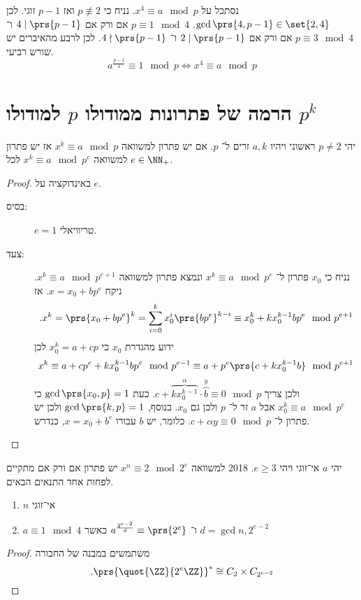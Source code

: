 \documentclass[a4paper,10pt,twoside,openany]{book}
\begin{document}
\begin{example}
נסתכל על
$x^4 \equiv a \mod{p}$.
נניח כי
$p \not \equiv 2$
ואז
$p-1$
זוגי. לכן
$\gcd\prs{4,p-1} \in \set{2,4}$.
$p \equiv 1 \mod{4}$
אם ורק אם
$4 \mid \prs{p-1}$
ו־%
$p \equiv 3 \mod{4}$
אם ורק אם
$2 \mid \prs{p-1}$
ו־%
$4 \nmid \prs{p-1}$.
לכן לרבע מהאיברים יש שורש רביעי.
\[a^{\frac{p-1}{4}} \equiv 1 \mod{p} \iff x^4 \equiv a \mod{p}\]
\end{example}

\section{הרמה של פתרונות ממודולו
$p$
למודולו
$p^k$}
\begin{proposition}
יהי
$p \neq 2$
ראשוני ויהיו
$a,k$
זרים ל־%
$p$.
אם יש פתרון למשוואה
$x^k \equiv a \mod{p}$
אז יש פתרון למשוואה
$x^k \equiv a \mod{p^e}$
לכל
$e \in \NN_+$.
\end{proposition}
\begin{proof}
באינדוקציה על
$e$.
\begin{description}
\item[בסיס:]
$e=1$
טריוויאלי.
\item[צעד:]
נניח כי
$x_0$
פתרון ל־%
$x^k \equiv a\mod{p^e}$
ונמצא פתרון למשוואה
$x^k \equiv a \mod{p^{e+1}}$.
ניקח
$x = x_0 + bp^e$.
אז
\[\text{.}x^k = \prs{x_0 + bp^e}^k = \sum_{i=0}^k x_0^i \prs{bp^e}^{k-i} \equiv x_0^k + kx_0^{k-1}bp^e \mod{p^{e+1}}\]
ידוע מהגדרת
$x_0$
כי
$x_0^k = a + cp$
לכן
\begin{align*}
x^k \equiv a + cp^e + kx_0^{k-1}bp^e \mod{p^{e-1}} \equiv a + p^e \prs{c + kx_0^{k-1}b}\mod{p^{e+1}}
\end{align*}
ולכן צריך
$c + \overset{\alpha}{\overbrace{kx_0^{k-1}}} \cdot \overset{y}{\overbrace{b}} \equiv 0 \mod{p}$.
כעת
$\gcd\prs{x_0, p} = 1$
כי
$x_0^k \equiv a \mod{p^e}$
אבל
$a$
זר ל־%
$p$
ולכן גם
$x_0$.
בנוסף,
$\gcd\prs{k,p} = 1$
ולכן יש פתרון ל־%
$c + \alpha y \equiv 0 \mod{p}$.
כלומר, יש
$b$
עבורו
$x = x_0 + b^e$,
כנדרש.
\end{description}
\end{proof}

\begin{proposition}
יהי
$a$
אי־זוגי ויהי
$e \geq 3$.
%
{2018}
למשוואה
$x^n \equiv 2 \mod{2^e}$
יש פתרון אם ורק אם מתקיים לפחות אחד התנאים הבאים.
\begin{enumerate}
\item
$n$
אי־זוגי
\item
$a \equiv 1 \mod{4}$
ו־%
$a^{\frac{2^{e-2}}{d}} \equiv \prs{2^e}$
כאשר
$d = \gcd{n, 2^{e-2}}$
\end{enumerate}
\end{proposition}
\begin{proof}
משתמשים במבנה של החבורה
\[\text{.}\prs{\quot{\ZZ}{2^e \ZZ}}^* \cong C_2 \times C_{2^{e - 2}}\]
\end{proof}
\end{document}
